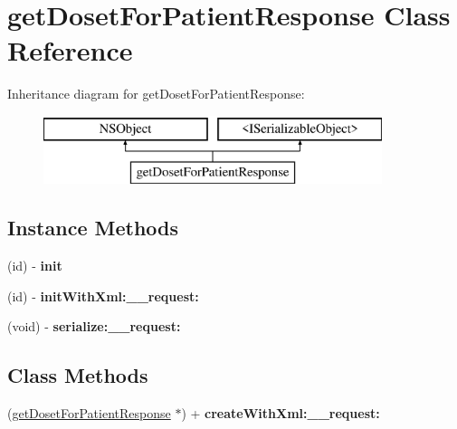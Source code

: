 \hypertarget{interfaceget_doset_for_patient_response}{}\section{get\+Doset\+For\+Patient\+Response Class Reference}
\label{interfaceget_doset_for_patient_response}
Inheritance diagram for get\+Doset\+For\+Patient\+Response\+:\begin{figure}[H]
\begin{center}
\leavevmode
\includegraphics[height=2.000000cm]{interfaceget_doset_for_patient_response}
\end{center}
\end{figure}
\subsection*{Instance Methods}
\begin{DoxyCompactItemize}
\item 
\hypertarget{interfaceget_doset_for_patient_response_a2241212f4e5c603288d4d7b080007a48}{}(id) -\/ {\bfseries init}\label{interfaceget_doset_for_patient_response_a2241212f4e5c603288d4d7b080007a48}

\item 
\hypertarget{interfaceget_doset_for_patient_response_abb26b2801307637e0fe8bbe38890b958}{}(id) -\/ {\bfseries init\+With\+Xml\+:\+\_\+\+\_\+request\+:}\label{interfaceget_doset_for_patient_response_abb26b2801307637e0fe8bbe38890b958}

\item 
\hypertarget{interfaceget_doset_for_patient_response_afabcaaad8bd8f0c2040dcb7893c51b9f}{}(void) -\/ {\bfseries serialize\+:\+\_\+\+\_\+request\+:}\label{interfaceget_doset_for_patient_response_afabcaaad8bd8f0c2040dcb7893c51b9f}

\end{DoxyCompactItemize}
\subsection*{Class Methods}
\begin{DoxyCompactItemize}
\item 
\hypertarget{interfaceget_doset_for_patient_response_a7ba52da1ef0111ae4a1ffc910bf665ca}{}(\hyperlink{interfaceget_doset_for_patient_response}{get\+Doset\+For\+Patient\+Response} $\ast$) + {\bfseries create\+With\+Xml\+:\+\_\+\+\_\+request\+:}\label{interfaceget_doset_for_patient_response_a7ba52da1ef0111ae4a1ffc910bf665ca}

\end{DoxyCompactItemize}
